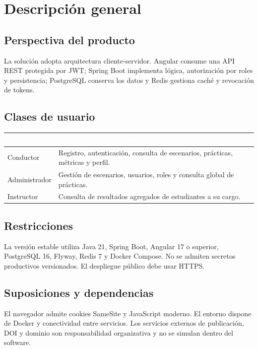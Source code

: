 \documentclass[11pt,a4paper]{article}
\begin{document}
\section{Descripción general}

\subsection{Perspectiva del producto}
La solución adopta arquitectura cliente-servidor. Angular consume una API REST protegida por JWT; Spring Boot implementa lógica, autorización por roles y persistencia; PostgreSQL conserva los datos y Redis gestiona caché y revocación de tokens.

\subsection{Clases de usuario}
\begin{table}[h]
    \centering
    \renewcommand{\arraystretch}{1.3}
    \begin{tabularx}{\textwidth}{@{}|l|X|@{}}
        \hline
        \rowcolor{uteqblue}
        \textcolor{white}{\textbf{Rol}} & \textcolor{white}{\textbf{Capacidades principales}} \\ \hline
        Conductor & Registro, autenticación, consulta de escenarios, prácticas, métricas y perfil. \\ \hline
        Administrador & Gestión de escenarios, usuarios, roles y consulta global de prácticas. \\ \hline
        Instructor & Consulta de resultados agregados de estudiantes a su cargo. \\ \hline
    \end{tabularx}
\end{table}

\subsection{Restricciones}
La versión estable utiliza Java 21, Spring Boot, Angular 17 o superior, PostgreSQL 16, Flyway, Redis 7 y Docker Compose. No se admiten secretos productivos versionados. El despliegue público debe usar HTTPS.

\subsection{Suposiciones y dependencias}
El navegador admite cookies SameSite y JavaScript moderno. El entorno dispone de Docker y conectividad entre servicios. Los servicios externos de publicación, DOI y dominio son responsabilidad organizativa y no se simulan dentro del software.
\end{document}
